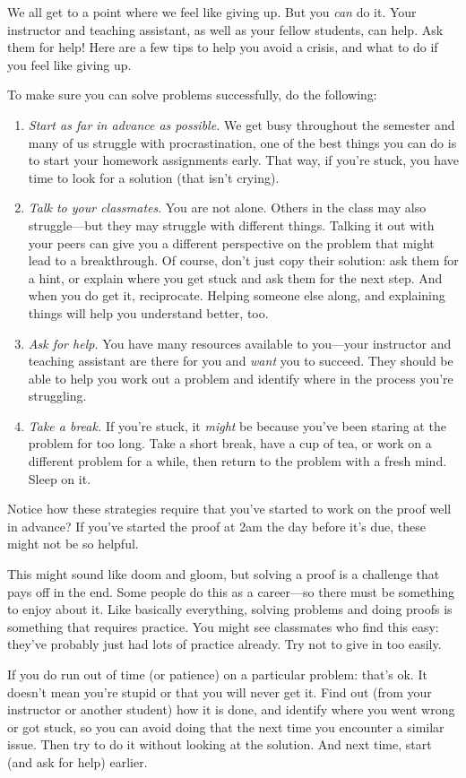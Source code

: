 \documentclass[../../../include/open-logic-section]{subfiles}
\begin{document}

We all get to a point where we feel like giving up. But you \emph{can}
do it. Your instructor and teaching assistant, as well as your fellow
students, can help. Ask them for help!{}  Here are a few tips to help
you avoid a crisis, and what to do if you feel like giving up.

To make sure you can solve problems successfully, do the
following:
\begin{enumerate}
\item \emph{Start as far in advance as possible.} We get busy
  throughout the semester and many of us struggle with
  procrastination, one of the best things you can do is to start your
  homework assignments early. That way, if you're stuck, you have time
  to look for a solution (that isn't crying).
\item \emph{Talk to your classmates}.  You are not alone. Others in
  the class may also struggle---but they may struggle with different
  things. Talking it out with your peers can give you a different
  perspective on the problem that might lead to a breakthrough.  Of
  course, don't just copy their solution: ask them for a hint, or
  explain where you get stuck and ask them for the next step. And when
  you do get it, reciprocate. Helping someone else along, and
  explaining things will help you understand better, too.
\item \emph{Ask for help.} You have many resources available to
  you---your instructor and teaching assistant are there for you and
  \emph{want} you to succeed. They should be able to help you work out
  a problem and identify where in the process you're struggling.
\item \emph{Take a break.} If you're stuck, it \emph{might} be because
  you've been staring at the problem for too long. Take a short break,
  have a cup of tea, or work on a different problem for a while, then
  return to the problem with a fresh mind. Sleep on it.
\end{enumerate}

Notice how these strategies require that you've started to work on the
proof well in advance? If you've started the proof at 2am the day
before it's due, these might not be so helpful.

This might sound like doom and gloom, but solving a proof is a
challenge that pays off in the end. Some people do this as a
career---so there must be something to enjoy about it. Like basically
everything, solving problems and doing proofs is something that
requires practice.  You might see classmates who find this easy:
they've probably just had lots of practice already.  Try not to give
in too easily.

If you do run out of time (or patience) on a particular problem:
that's ok. It doesn't mean you're stupid or that you will never get
it. Find out (from your instructor or another student) how it is done,
and identify where you went wrong or got stuck, so you can avoid doing
that the next time you encounter a similar issue.  Then try to do it
without looking at the solution.  And next time, start (and ask for
help) earlier.
\end{document}
